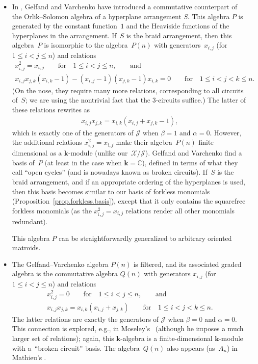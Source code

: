 \documentclass[pdftex]{sigma}
\numberwithin{equation}{section}
\begin{document}
\begin{itemize}
\item In \cite{VarGel87}, Gelfand and Varchenko have introduced a commutative counterpart of the Orlik--Solomon algebra of a hyperplane arrangement $S$. This algebra $P$ is generated by the constant function~$1$ and the Heaviside functions of the hyperplanes in the arrangement. If~$S$ is the braid arrangement, then this algebra~$P$ is isomorphic to the algebra~$P(n) $ with generators~$x_{i,j}$ (for $1\leq i<j\leq n$) and relations
\begin{gather*}
x_{i,j}^{2} =x_{i,j} \qquad \text{for} \quad 1\leq i<j\leq n, \qquad \text{and}\\
x_{i,j}x_{j,k} ( x_{i,k}-1 ) - ( x_{i,j}-1 ) (x_{j,k}-1) x_{i,k} =0 \qquad \text{for} \quad 1\leq i<j<k\leq n.
\end{gather*}
(On the nose, they require many more relations, corresponding to all circuits of~$S$; we are using the nontrivial fact that the $3$-circuits suffice.) The latter of these relations rewrites as
\begin{gather*}
x_{i,j}x_{j,k}=x_{i,k} ( x_{i,j}+x_{j,k}-1 ) ,
\end{gather*}
which is exactly one of the generators of $\mathcal{J}$ when $\beta=1$ and $\alpha=0$. However, the additional relations $x_{i,j}^{2}=x_{i,j}$ make their algebra~$P(n) $ finite-dimensional as a $\mathbf{k}$-module (unlike our~$\mathcal{X}/\mathcal{J}$). Gelfand and Varchenko find a basis of~$P$ (at least in the case when $\mathbf{k}=\mathbb{C}$), defined in terms of what they call ``open cycles'' (and is nowadays known as broken circuits). If~$S$ is the braid arrangement, and if an appropriate ordering of the hyperplanes is used, then this basis becomes similar to our basis of forkless monomials (Proposition~\ref{prop.forkless.basis}), except that it only contains the squarefree forkless monomials (as the $x_{i,j}^{2}=x_{i,j}$ relations render all other monomials redundant).

This algebra $P$ can be straightforwardly generalized to arbitrary oriented matroids.

\item The Gelfand--Varchenko algebra $P(n) $ is filtered, and its associated graded algebra is the commutative algebra $Q(n)$ with generators $x_{i,j}$ (for $1\leq i<j\leq n$) and relations
\begin{gather*}
x_{i,j}^{2} =0\qquad \text{for} \quad 1\leq i<j\leq n, \qquad \text{and}\\
x_{i,j}x_{j,k} =x_{i,k} ( x_{i,j}+x_{j,k} ) \qquad \text{for} \quad 1\leq i<j<k\leq n.
\end{gather*}
The latter relations are exactly the generators of $\mathcal{J}$ when $\beta=0$ and $\alpha=0$. This connection is explored, e.g., in Moseley's~\cite{Mosele12} (although he imposes a much larger set of relations); again, this $\mathbf{k}$-algebra is a finite-dimensional $\mathbf{k}$-module with a~``broken circuit'' basis. The algebra~$Q(n) $ also appears (as~$A_{n}$) in Mathieu's \cite[Section~6]{Mathie95}.


\end{itemize}
\end{document}
